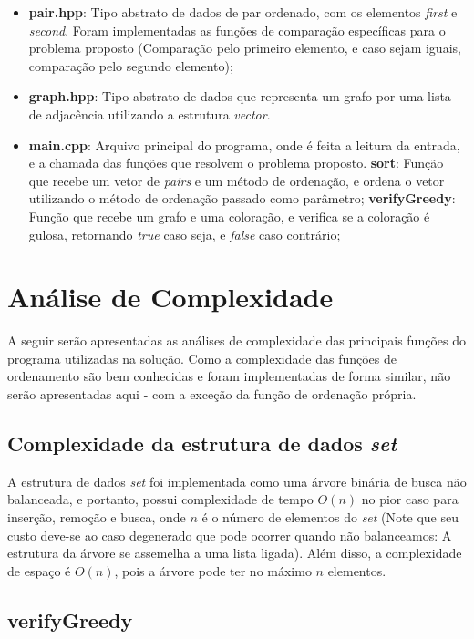 \documentclass{article}
\begin{document}
\begin{itemize}
    \item \textbf{pair.hpp}: Tipo abstrato de dados de par ordenado, com os elementos \emph{first} e \emph{second}. Foram implementadas as funções de comparação específicas para o problema proposto (Comparação pelo primeiro elemento, e caso sejam iguais, comparação pelo segundo elemento);
    \item \textbf{graph.hpp}: Tipo abstrato de dados que representa um grafo por uma lista de adjacência utilizando a estrutura \emph{vector}. 
    \item \textbf{main.cpp}: Arquivo principal do programa, onde é feita a leitura da entrada, e a chamada das funções que resolvem o problema proposto.
        \subitem \textbf{sort}: Função que recebe um vetor de \emph{pairs} e um método de ordenação, e ordena o vetor utilizando o método de ordenação passado como parâmetro;
        \subitem \textbf{verifyGreedy}: Função que recebe um grafo e uma coloração, e verifica se a coloração é gulosa, retornando \emph{true} caso seja, e \emph{false} caso contrário;
    
\end{itemize}

\section{Análise de Complexidade}

A seguir serão apresentadas as análises de complexidade das principais funções do programa utilizadas na solução. Como a complexidade das funções de ordenamento são bem conhecidas e foram implementadas de forma similar, não serão apresentadas aqui - com a exceção da função de ordenação própria.

\subsection{Complexidade da estrutura de dados \emph{set}}

A estrutura de dados \emph{set} foi implementada como uma árvore binária de busca não balanceada, e portanto, possui complexidade de tempo $ O(n)$ no pior caso para inserção, remoção e busca, onde $n$ é o número de elementos do \emph{set} (Note que seu custo deve-se ao caso degenerado que pode ocorrer quando não balanceamos: A estrutura da árvore se assemelha a uma lista ligada). Além disso, a complexidade de espaço é $O(n)$, pois a árvore pode ter no máximo $n$ elementos.

\subsection{verifyGreedy}
\end{document}

